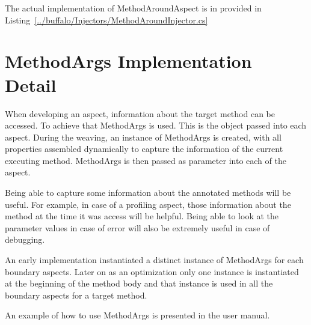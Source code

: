The actual implementation of MethodAroundAspect is in provided in Listing~\ref{../buffalo/Injectors/MethodAroundInjector.cs}

\section{MethodArgs Implementation Detail}

When developing an aspect, information about the target method can be accessed. To achieve that MethodArgs is used. This is the object passed into each aspect. During the weaving, an instance of MethodArgs is created, with all properties assembled dynamically to capture the information of the current executing method. MethodArgs is then passed as parameter into each of the aspect.

Being able to capture some information about the annotated methods will be useful. For example, in case of a profiling aspect, those information about the method at the time it was access will be helpful. Being able to look at the parameter values in case of error will also be extremely useful in case of debugging.

An early implementation instantiated a distinct instance of MethodArgs for each boundary aspects. Later on as an optimization only one instance is instantiated at the beginning of the method body and that instance is used in all the boundary aspects for a target method.

An example of how to use MethodArgs is presented in the user manual.
